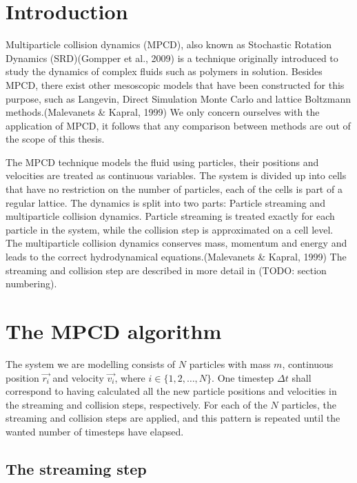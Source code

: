\documentclass[
]{article}
\begin{document}
\hypertarget{introduction}{%
\section{Introduction}\label{introduction}}

Multiparticle collision dynamics (MPCD), also known as Stochastic
Rotation Dynamics (SRD)(Gompper et al., 2009) is a technique originally
introduced to study the dynamics of complex fluids such as polymers in
solution. Besides MPCD, there exist other mesoscopic models that have
been constructed for this purpose, such as Langevin, Direct Simulation
Monte Carlo and lattice Boltzmann methods.(Malevanets \& Kapral, 1999)
We only concern ourselves with the application of MPCD, it follows that
any comparison between methods are out of the scope of this thesis.

The MPCD technique models the fluid using particles, their positions and
velocities are treated as continuous variables. The system is divided up
into cells that have no restriction on the number of particles, each of
the cells is part of a regular lattice. The dynamics is split into two
parts: Particle streaming and multiparticle collision dynamics. Particle
streaming is treated exactly for each particle in the system, while the
collision step is approximated on a cell level. The multiparticle
collision dynamics conserves mass, momentum and energy and leads to the
correct hydrodynamical equations.(Malevanets \& Kapral, 1999) The
streaming and collision step are described in more detail in (TODO:
section numbering).

\hypertarget{the-mpcd-algorithm}{%
\section{The MPCD algorithm}\label{the-mpcd-algorithm}}

The system we are modelling consists of \(N\) particles with mass \(m\),
continuous position \(\vec{r_{i}}\) and velocity \(\vec{v_{i}}\), where
\(i \in \{1, 2, \dots, N\}\). One timestep \(\Delta t\) shall correspond
to having calculated all the new particle positions and velocities in
the streaming and collision steps, respectively. For each of the \(N\)
particles, the streaming and collision steps are applied, and this
pattern is repeated until the wanted number of timesteps have elapsed.

\hypertarget{the-streaming-step}{%
\subsection{The streaming step}\label{the-streaming-step}}
\end{document}
